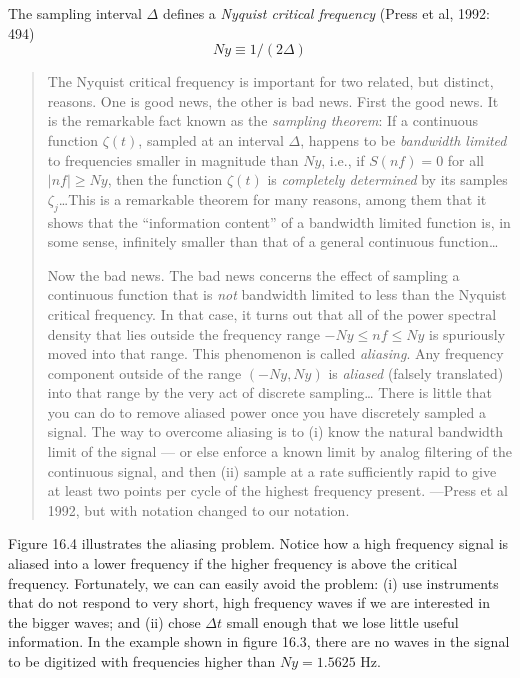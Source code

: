 The sampling interval $\Delta $ defines a \textit{Nyquist critical
  frequency}
(Press et al, 1992: 494)
\begin{equation}
Ny \equiv 1/( 2 \Delta )
\end{equation}
\begin{quotation} \small
The Nyquist critical frequency is important for two related, but
distinct, reasons. One is good news, the other is bad news. First the
good news. It is the remarkable fact known as the \textit{sampling
  theorem}: If a continuous function $\zeta(t)$, sampled at an
interval $\Delta $, happens to be \textit{bandwidth limited} to
frequencies smaller in magnitude than $Ny$, i.e., if $S(nf)=0$ for all
$|nf| \geq Ny$, then the function $\zeta(t)$ is \textit{completely
  determined} by its samples $\zeta _j$\dots This is a remarkable
theorem for many reasons, among them that it shows that the
``information content'' of a bandwidth limited function is, in some
sense, infinitely smaller than that of a general continuous
function\dots

Now the bad news. The bad news concerns the effect of sampling a
continuous function that is \textit{not} bandwidth limited to less
than the Nyquist critical frequency. In that case, it turns out that
all of the power spectral density that lies outside the frequency
range $-Ny \le nf \le Ny$ is spuriously moved into that range. This
phenomenon is called \textit{aliasing}. Any frequency component
outside of the range $(-Ny, Ny)$ is \textit{aliased} (falsely
translated) into that range by the very act of discrete sampling\dots
There is little that you can do to remove aliased power once you have
discretely sampled a signal. The way to overcome aliasing is to (i)
know the natural bandwidth limit of the signal --- or else enforce a
known limit by analog filtering of the continuous signal, and then
(ii) sample at a rate sufficiently rapid to give at least two points
per cycle of the highest frequency present. ---Press et al 1992, but
with notation changed to our notation.
\end{quotation}

Figure 16.4 illustrates the aliasing problem. Notice how a high
frequency signal is aliased into a lower frequency if the higher
frequency is above the critical frequency. Fortunately, we can can
easily avoid the problem: (i) use instruments that do not respond to
very short, high frequency waves if we are interested in the bigger
waves; and (ii) chose $\Delta t$ small enough that we lose little
useful information. In the example shown in figure 16.3, there are no
waves in the signal to be digitized with frequencies higher than $Ny =
1.5625$ Hz.

